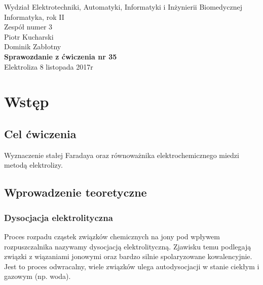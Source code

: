 \documentclass[a4paper,12pts]{article}
\begin{document}
	\thispagestyle{empty}
	\begin{flushleft}
		Wydział Elektrotechniki, Automatyki, Informatyki i Inżynierii Biomedycznej \\
		Informatyka, rok II \\
		Zespół numer 3 \\
		Piotr Kucharski \\
		Dominik Zabłotny \\
		\vspace*{\fill}
		{\large \textbf{Sprawozdanie z ćwiczenia nr 35} } \\
		Elektroliza		
		\vfill	
		8 listopada 2017r
	\end{flushleft}
	
	\newpage
	
	
	\section{Wstęp}
	
		\subsection{Cel ćwiczenia}
		Wyznaczenie stałej Faradaya oraz równoważnika elektrochemicznego miedzi metodą elektrolizy.
	
	
		\subsection{Wprowadzenie teoretyczne}
	
			\subsubsection{Dysocjacja elektrolityczna}
			Proces rozpadu cząstek związków chemicznych na jony pod wpływem rozpuszczalnika nazywamy dysocjacją elektrolityczną. Zjawisku temu podlegają związki z wiązaniami jonowymi oraz bardzo silnie spolaryzowane kowalencyjnie. Jest to proces odwracalny, wiele związków ulega autodysocjacji w stanie ciekłym i gazowym (np. woda).
			
\end{document}
